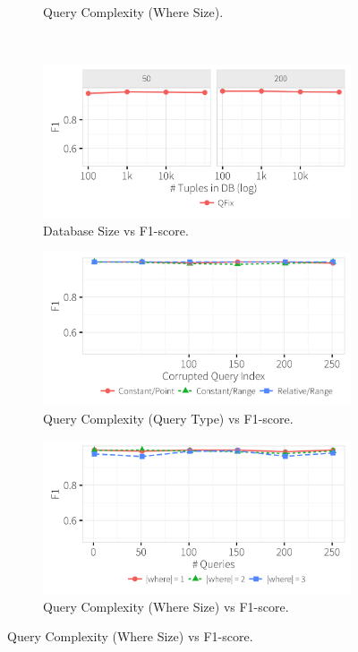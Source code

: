 \begin{figure}[h]
\begin{subfigure}[t]{.3\textwidth}
      \vspace*{-.1in}
      \caption{Query Complexity (Where Size).}
      \label{f:where_time} 
    \end{subfigure}
    \\
    \begin{subfigure}[t]{.3\textwidth}
      \includegraphics[width = .99\columnwidth]{figures/dbsize_acc}
      \vspace*{-.1in}
      \caption{Database Size vs F1-score. }
      \label{f:dbsize_acc} 
    \end{subfigure}
        \begin{subfigure}[t]{.3\textwidth}
      \includegraphics[width = .99\columnwidth]{figures/pointrelv_acc}
      \vspace*{-.1in}
      \caption{Query Complexity (Query Type) vs F1-score.}
      \label{f:qidx_acc} 
    \end{subfigure}
    \begin{subfigure}[t]{.3\textwidth}
      \includegraphics[width = .99\columnwidth]{figures/where_acc}
      \vspace*{-.1in}
      \caption{Query Complexity (Where Size) vs F1-score.}
      \label{f:where_acc} 
    \end{subfigure}
    

\end{figure}
